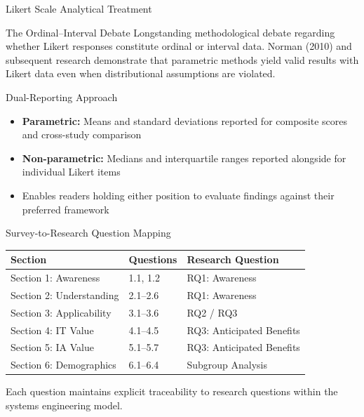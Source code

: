 \documentclass{beamer}
\begin{document}
\begin{frame}[allowframebreaks]{Likert Scale Analytical Treatment}
  \begin{block}{The Ordinal--Interval Debate}
    Longstanding methodological debate regarding whether Likert responses constitute ordinal or interval data. Norman (2010) and subsequent research demonstrate that parametric methods yield valid results with Likert data even when distributional assumptions are violated.
  \end{block}

  \begin{block}{Dual-Reporting Approach}
    \begin{itemize}
      \item \textbf{Parametric:} Means and standard deviations reported for composite scores and cross-study comparison
      \item \textbf{Non-parametric:} Medians and interquartile ranges reported alongside for individual Likert items
      \item Enables readers holding either position to evaluate findings against their preferred framework
    \end{itemize}
  \end{block}
\end{frame}

\begin{frame}[allowframebreaks]{Survey-to-Research Question Mapping}
  \begin{table}[H]
    \begin{scriptsize}
      \begin{tabular}{@{}lll@{}}
        \toprule
        \textbf{Section} & \textbf{Questions} & \textbf{Research Question} \\
        \midrule
        Section 1: Awareness & 1.1, 1.2 & RQ1: Awareness \\
        Section 2: Understanding & 2.1--2.6 & RQ1: Awareness \\
        Section 3: Applicability & 3.1--3.6 & RQ2 / RQ3 \\
        Section 4: IT Value & 4.1--4.5 & RQ3: Anticipated Benefits \\
        Section 5: IA Value & 5.1--5.7 & RQ3: Anticipated Benefits \\
        Section 6: Demographics & 6.1--6.4 & Subgroup Analysis \\
        \bottomrule
      \end{tabular}
    \end{scriptsize}
  \end{table}

  \vspace{0.3cm}
  Each question maintains explicit traceability to research questions within the systems engineering model.
\end{frame}
\end{document}

